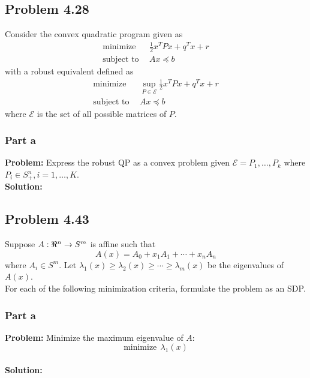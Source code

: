 \documentclass[letter]{article}
\begin{document}
\subsection{Problem 4.28}
Consider the convex quadratic program given as
\begin{equation}\label{eq:convex_quadratic_program}
	\begin{aligned}
		\text{minimize} \ \ & \frac{1}{2} x^T P x + q^T x + r\\
		\text{subject to} \ \ & Ax \preceq b
	\end{aligned}
\end{equation}
with a robust equivalent defined as
\begin{equation}\label{eq:robust_convex_quadratic_program}
	\begin{aligned}
		\text{minimize} \ \ & \sup_{P\in \mathcal{E}}{\frac{1}{2} x^T P x + q^T x + r}\\
		\text{subject to} \ \ & Ax \preceq b
	\end{aligned}
\end{equation}
where $\mathcal{E}$ is the set of all possible matrices of $P$.

\subsubsection{Part a}
\textbf{Problem:}
Express the robust QP as a convex problem given $\mathcal{E} = {P_1,\dots,P_k}$ where $P_i\in S^n_+, i = 1,\dots,K$.\\

\textbf{Solution:}







\newpage
\subsection{Problem 4.43}
Suppose $A: \real^n \to S^m$ is affine such that
\begin{equation}
	A(x) = A_0 + x_1 A_1 + \cdots + x_n A_n
\end{equation}
where $A_i \in S^m$. Let $\lambda_1(x) \geq \lambda_2(x) \geq \cdots \geq \lambda_m(x)$ be the eigenvalues of $A(x)$.\\


For each of the following minimization criteria, formulate the problem as an SDP.\\

\subsubsection{Part a}
\textbf{Problem:}
Minimize the maximum eigenvalue of $A$: $$\text{minimize} \ \ \lambda_1(x)$$\\
\textbf{Solution:}
\end{document}
